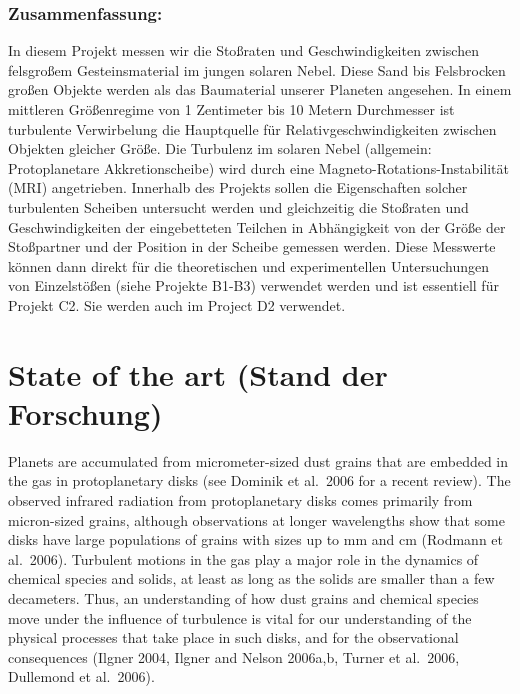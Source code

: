 \subsubsection{Zusammenfassung:} 
%
In diesem Projekt messen wir die Sto{\ss}raten und Geschwindigkeiten
zwi\-sch\-en felsgro{\ss}em Gesteinsmaterial im jungen solaren Nebel.  Diese
Sand bis Felsbrocken gro{\ss}en Objekte werden als das Baumaterial unserer
Planeten angesehen. In einem mittleren Gr\"o{\ss}enregime von 1 Zentimeter
bis 10 Metern Durchmesser ist turbulente Verwirbelung die Haupt\-quel\-le
f\"ur Relativgeschwindigkeiten zwischen Objekten gleicher Gr\"o{\ss}e.  Die
Turbulenz im solaren Nebel (allgemein: Protoplanetare Akkretionscheibe) wird
durch eine Magneto-Rotations-Instabilit\"at (MRI) angetrieben.  Innerhalb
des Projekts sollen die Eigenschaften solcher turbulenten Scheiben
untersucht werden und gleichzeitig die Sto{\ss}raten und Geschwindigkeiten
der eingebetteten Teilchen in Abh\"angigkeit von der Gr\"o{\ss}e der
Sto{\ss}partner und der Position in der Scheibe gemessen werden.  Diese
Messwerte k\"onnen dann direkt f\"ur die theoretischen und experimentellen
Untersuchungen von Einzelst\"o{\ss}en (siehe Projekte B1-B3) verwendet
werden und ist essentiell f\"ur Projekt C2. Sie werden auch im Project
D2 verwendet.
%
\section{State of the art (Stand der Forschung)}
%
Planets are accumulated from  micrometer-sized dust grains that are
embedded in the gas in protoplanetary disks (see Dominik et al.\ 2006 for a
recent review).  The observed infrared radiation from protoplanetary disks
comes primarily from micron-sized grains, although observations at longer
wavelengths show that some disks have large populations of grains with sizes
up to mm and cm (Rodmann et al.\ 2006). Turbulent motions in the gas play a
major role in the dynamics of chemical species and solids, at least as long
as the solids are smaller than a few decameters. Thus, an understanding of
how dust grains and chemical species move under the influence of turbulence
is vital for our understanding of the physical processes that take place in
such disks, and for the observational consequences (Ilgner 2004, Ilgner and
Nelson 2006a,b, Turner et al.\ 2006, Dullemond et al.\ 2006).

